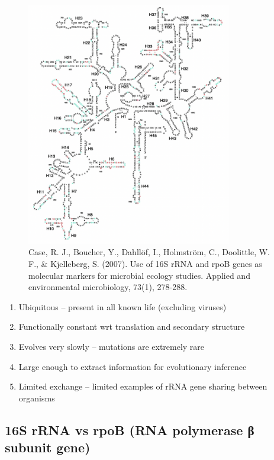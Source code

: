 \documentclass[
]{book}
\providecommand{\tightlist}{%
  \setlength{\itemsep}{0pt}\setlength{\parskip}{0pt}}
\begin{document}
\begin{figure}
\centering
\includegraphics[width=0.8\textwidth,height=\textheight]{./Figures/16s.png}
\caption{Case, R. J., Boucher, Y., Dahllöf, I., Holmström, C., Doolittle, W. F., \& Kjelleberg, S. (2007). Use of 16S rRNA and rpoB genes as molecular markers for microbial ecology studies. Applied and environmental microbiology, 73(1), 278-288.}
\end{figure}

\begin{enumerate}
\def\labelenumi{\arabic{enumi}.}
\tightlist
\item
  Ubiquitous -- present in all known life (excluding viruses)
\item
  Functionally constant wrt translation and secondary structure
\item
  Evolves very slowly -- mutations are extremely rare
\item
  Large enough to extract information for evolutionary inference
\item
  Limited exchange -- limited examples of rRNA gene sharing between organisms
\end{enumerate}

\hypertarget{s-rrna-vs-rpob-rna-polymerase-ux3b2-subunit-gene}{%
\subsection{16S rRNA vs rpoB (RNA polymerase β subunit gene)}\label{s-rrna-vs-rpob-rna-polymerase-ux3b2-subunit-gene}}
\end{document}
